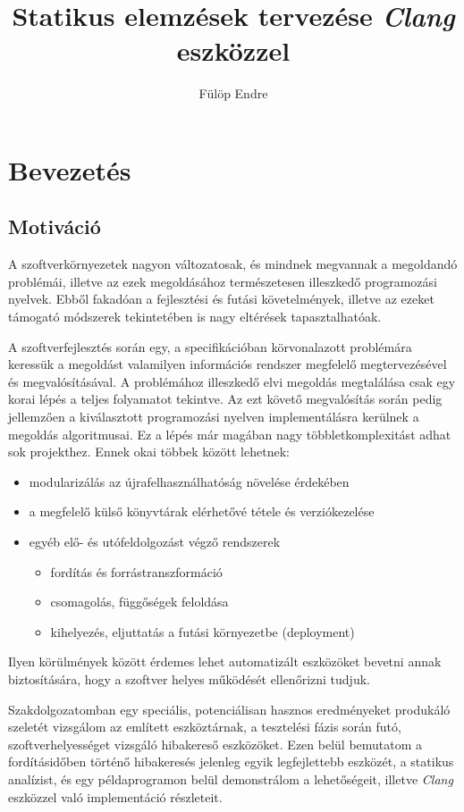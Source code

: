 \documentclass[a4paper,12pt]{report}
\title{Statikus elemzések tervezése \emph{Clang} eszközzel}
\author{Fülöp Endre}
\begin{document}


\tableofcontents

\chapter{Bevezetés}
\section{Motiváció}
A szoftverkörnyezetek nagyon változatosak, és mindnek megvannak a megoldandó problémái, illetve az ezek megoldásához természetesen illeszkedő programozási nyelvek. Ebből fakadóan a fejlesztési és futási követelmények, illetve az ezeket támogató módszerek tekintetében is nagy eltérések tapasztalhatóak.

A szoftverfejlesztés során egy, a specifikációban körvonalazott problémára keressük a megoldást valamilyen információs rendszer megfelelő megtervezésével és megvalósításával. A problémához illeszkedő elvi megoldás megtalálása csak egy korai lépés a teljes folyamatot tekintve. Az ezt követő megvalósítás során pedig jellemzően a kiválasztott programozási nyelven implementálásra kerülnek a megoldás algoritmusai. Ez a lépés már magában nagy többletkomplexitást adhat sok projekthez. Ennek okai többek között lehetnek:
\begin{itemize}
\item modularizálás az újrafelhasználhatóság növelése érdekében
\item a megfelelő külső könyvtárak elérhetővé tétele és verziókezelése
\item egyéb elő- és utófeldolgozást végző rendszerek
\begin{itemize}
\item fordítás és forrástranszformáció
\item csomagolás, függőségek feloldása
\item kihelyezés, eljuttatás a futási környezetbe (deployment)
\end{itemize}
\end{itemize}
Ilyen körülmények között érdemes lehet automatizált eszközöket bevetni annak biztosítására, hogy a szoftver helyes működését ellenőrizni tudjuk.

Szakdolgozatomban egy speciális, potenciálisan hasznos eredményeket produkáló szeletét vizsgálom az említett eszköztárnak, a tesztelési fázis során futó, szoftverhelyességet vizsgáló hibakereső eszközöket. Ezen belül bemutatom a fordításidőben történő hibakeresés jelenleg egyik legfejlettebb eszközét, a statikus analízist, és egy példaprogramon belül demonstrálom a lehetőségeit, illetve \emph{Clang} eszközzel való implementáció részleteit.
\end{document}
